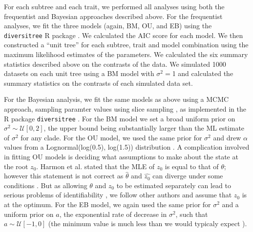 \documentclass[a4paper,12pt]{article}
\begin{document}
For each subtree and each trait, we performed all analyses using both the frequentist and Bayesian approaches described above. For the frequentist analyses, we fit the three models (again, BM, OU, and EB) using the \texttt{diversitree} R package \citep{FitzJohn2012}. We calculated the AIC \citep{Akaike1974} score for each model. We then constructed a ``unit tree'' for each subtree, trait and model combination using the maximum likelihood estimates of the parameters. We calculated the six summary statistics described above on the contrasts of the data. We simulated 1000 datasets on each unit tree using a BM model with $\sigma^2=$1 and calculated the summary statistics on the contrasts of each simulated data set. 

For the Bayesian analysis, we fit the same models as above using a MCMC approach, sampling paramter values using slice sampling \citep{Nealslice}, as implemented in the R package \texttt{diversitree} \citep{FitzJohn2012}. For the BM model we set a broad uniform prior on $\sigma^2 \sim \mathcal{U}[0, 2]$, the upper bound being substantially larger than the ML estimate of $\sigma^2$ for any clade. For the OU model, we used the same prior for $\sigma^2$ and drew $\alpha$ values from a Lognormal(log(0.5), log(1.5)) distribution \citep{UyedaBayou}. A complication involved in fitting OU models is deciding what assumptions to make about the state at the root $z_0$. Harmon et al. \citep{Harmon2010} stated that the MLE of $z_0$ is equal to that of $\theta$; however this statement is not correct as $\hat{\theta}$ and $\hat{z_0}$ can diverge under some conditions \citep{HoAne2012}. But as allowing $\theta$ and $z_0$ to be estimated separately can lead to serious problems of identifiability \citep{HoAne2012}, we follow other authors \citep{ButlerKing2004, Beaulieu2012} and assume that $z_0$ is at the optimum. For the EB model, we again used the same prior for $\sigma^2$ and a uniform prior on $a$, the exponential rate of decrease in $\sigma^2$, such that $a \sim \mathcal{U}[-1, 0]$ (the minimum value is much less than we would typicaly expect \citep{SlaterPennell}).
\end{document}
